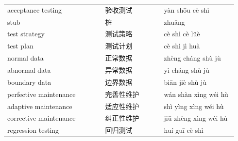 \documentclass[11pt]{article}
\begin{document}
\begin{longtable}{@{}p{0.40\linewidth}p{0.24\linewidth}p{0.30\linewidth}@{}}
acceptance testing & 验收测试 & yàn shōu cè shì \\
stub & 桩 & zhuāng \\
test strategy & 测试策略 & cè shì cè lüè \\
test plan & 测试计划 & cè shì jì huà \\
normal data & 正常数据 & zhèng cháng shù jù \\
abnormal data & 异常数据 & yì cháng shù jù \\
boundary data & 边界数据 & biān jiè shù jù \\
perfective maintenance & 完善性维护 & wán shàn xìng wéi hù \\
adaptive maintenance & 适应性维护 & shì yìng xìng wéi hù \\
corrective maintenance & 纠正性维护 & jiū zhèng xìng wéi hù \\
regression testing & 回归测试 & huí guī cè shì \\
\end{longtable}
\end{document}
